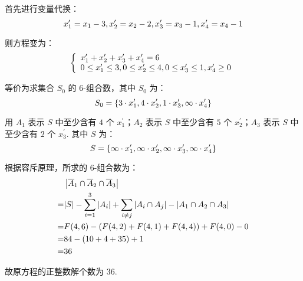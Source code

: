 \documentclass[cn, hazy, blue, normal, 12pt]{elegantnote}
\begin{document}
\begin{solution}[print=true]

    首先进行变量代换：
    \begin{equation}
        \notag
        x_1^{\prime} = x_1-3, x_2^{\prime} = x_2-2, x_3^{\prime} = x_3-1, x_4^{\prime} = x_4-1
    \end{equation}

    则方程变为：
    \begin{equation}
        \notag
        \left\{
        \begin{array}{l}
            x_1^{\prime} + x_2^{\prime} + x_3^{\prime} + x_4^{\prime} = 6 \\
            0 \leq x_1^{\prime} \leq 3, 0 \leq x_2^{\prime} \leq 4, 0 \leq x_3^{\prime} \leq 1, x_4^{\prime} \geq 0
        \end{array}
        \right.
    \end{equation}

    等价为求集合 $S_0$ 的 $6\text{-}$组合数，其中 $S_0$ 为：
    \begin{equation}
        \notag
        S_0 = \left\{ 3 \cdot x_1^{\prime}, 4 \cdot x_2^{\prime}, 1 \cdot x_3^{\prime}, \infty \cdot x_4^{\prime} \right\}
    \end{equation}

    用 $A_1$ 表示 $S$ 中至少含有 $4$ 个 $x_1^{\prime}$；$A_2$ 表示 $S$ 中至少含有 $5$ 个 $x_2^{\prime}$；$A_3$ 表示 $S$ 中至少含有 $2$ 个 $x_3^{\prime}$. 其中 $S$ 为：
    \begin{equation}
        \notag
        S = \left\{ \infty \cdot x_1^{\prime}, \infty \cdot x_2^{\prime}, \infty \cdot x_3^{\prime}, \infty \cdot x_4^{\prime} \right\}
    \end{equation}

    根据容斥原理，所求的 $6\text{-}$组合数为：
    \begin{equation}
        \notag
        \begin{aligned}
              & \left| \overline{A}_1 \cap \overline{A}_2 \cap \overline{A}_3 \right|                                                          \\
            = & |S| - \sum_{i=1}^{3}{\left| A_i \right|} + \sum_{i \neq j}{\left| A_i \cap A_j \right|} - \left| A_1 \cap A_2 \cap A_3 \right| \\
            = & F(4,6) - \left(F(4,2)+F(4,1)+F(4,4)\right) + F(4,0) - 0                                                                        \\
            = & 84-(10+4+35)+1                                                                                                                 \\
            = & 36
        \end{aligned}
    \end{equation}

    故原方程的正整数解个数为 $36$.

\end{solution}
\end{document}
